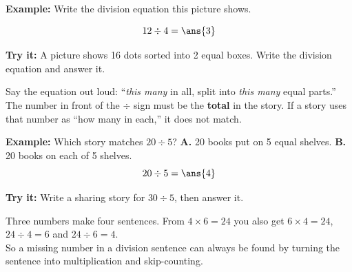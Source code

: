 \documentclass[12pt]{article}
\begin{document}
\begin{examplebox}
\textbf{Example:} Write the division equation this picture shows.
\begin{center}
\fbox{$\bullet\ \bullet\ \bullet$}\quad
\fbox{$\bullet\ \bullet\ \bullet$}\quad
\fbox{$\bullet\ \bullet\ \bullet$}\quad
\fbox{$\bullet\ \bullet\ \bullet$}
\end{center}
\[ 12 \div 4 = \ans{3} \]
\end{examplebox}

\begin{tryitbox}
\textbf{Try it:} A picture shows 16 dots sorted into 2 equal boxes. Write the
division equation and answer it.\\[2pt]
\end{tryitbox}


\begin{formulabox}
Say the equation out loud: ``\emph{this many} in all, split into \emph{this
many} equal parts.'' The number in front of the $\div$ sign must be the
\textbf{total} in the story. If a story uses that number as ``how many in
each,'' it does not match.
\end{formulabox}

\begin{examplebox}
\textbf{Example:} Which story matches $20 \div 5$? \;
\textbf{A.} 20 books put on 5 equal shelves. \;
\textbf{B.} 20 books on each of 5 shelves.
\[ 20 \div 5 = \ans{4} \]
\end{examplebox}

\begin{tryitbox}
\textbf{Try it:} Write a sharing story for $30 \div 5$, then answer it.\\[2pt]
\end{tryitbox}


\begin{formulabox}
Three numbers make four sentences. From $4 \times 6 = 24$ you also get
$6 \times 4 = 24$, $24 \div 4 = 6$ and $24 \div 6 = 4$.\\[2pt]
So a missing number in a division sentence can always be found by turning the
sentence into multiplication and skip-counting.
\end{formulabox}
\end{document}
